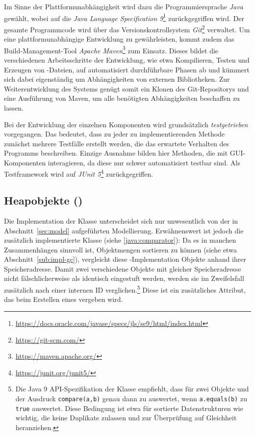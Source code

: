 Im Sinne der Plattformunabhängigkeit wird dazu die Programmiersprache \textit{Java} gewählt, wobei auf die \textit{Java Language Specification 9}\footnote{\url{https://docs.oracle.com/javase/specs/jls/se9/html/index.html}} zurückgegriffen wird.
Der gesamte Programmcode wird über das Versionskontrollsystem \textit{Git}\footnote{\url{https://git-scm.com/}} verwaltet.
Um eine plattformunabhängige Entwicklung zu gewährleisten, kommt zudem das Build-Management-Tool \textit{Apache Maven}\footnote{\url{https://maven.apache.org/}} zum Einsatz.
Dieses bildet die verschiedenen Arbeitsschritte der Entwicklung, wie etwa Kompilieren, Testen und Erzeugen von -Dateien, auf automatisiert durchführbare Phasen ab und kümmert sich dabei eigenständig um Abhängigkeiten von externen Bibliotheken.
Zur Weiterentwicklung des Systems genügt somit ein Klonen des Git-Repositorys und eine Ausführung von Maven, um alle benötigten Abhängigkeiten beschaffen zu lassen.

Bei der Entwicklung der einzelnen Komponenten wird grundsätzlich \textit{testgetrieben} vorgegangen.
Das bedeutet, dass zu jeder zu implementierenden Methode zunächst mehrere Testfälle erstellt werden, die das erwartete Verhalten des Programms beschreiben.
Einzige Ausnahme bilden hier Methoden, die mit GUI-Komponenten interagieren, da diese nur schwer automatisiert testbar sind.
Als Testframework wird auf \textit{JUnit 5}\footnote{\url{https://junit.org/junit5/}} zurückgegriffen.

\subsection{Heapobjekte ()}
\label{sub:heapobject}
Die Implementation der Klasse  unterscheidet sich nur unwesentlich von der in Abschnitt~\ref{sec:model} aufgeführten Modellierung.
Erwähnenswert ist jedoch die zusätzlich implementierte Klasse  (siehe \ref{java:comparator}):
Da es in manchen Zusammenhängen sinnvoll ist, Objektmengen sortieren zu können (siehe etwa Abschnitt~\ref{sub:impl-gc}), vergleicht diese -Implementation Objekte anhand ihrer Speicheradresse.
Damit zwei verschiedene Objekte mit gleicher Speicheradresse nicht fälschlicherweise als identisch eingestuft werden, werden sie im Zweifelsfall zusätzlich nach einer internen ID verglichen.\footnote{Die Java 9 API-Spezifikation der Klasse  empfiehlt, dass für zwei Objekte  und  der Ausdruck \texttt{compare(a,b)} genau dann zu  auswertet, wenn \texttt{a.equals(b)} zu \texttt{true} auswertet. Diese Bedingung ist etwa für sortierte Datenstrukturen wie  wichtig, die keine Duplikate zulassen und  zur Überprüfung auf Gleichheit heranziehen.}
Diese ist ein zusätzliches Attribut, das beim Erstellen eines  vergeben wird.

